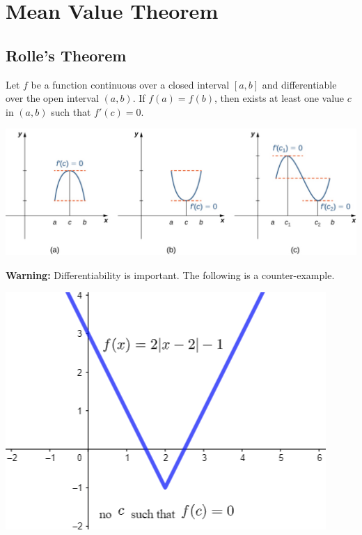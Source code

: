
\hypertarget{mean-value-theorem}{%
\section{Mean Value Theorem}\label{mean-value-theorem}}

\hypertarget{rolles-theorem}{%
\subsection{Rolle's Theorem}\label{rolles-theorem}}

Let \(f\) be a function continuous over a closed interval \([a,b]\) and
differentiable over the open interval \((a,b)\). If \(f(a)=f(b)\), then
exists at least one value \(c\) in \((a,b)\) such that \(f'(c)=0\).

\begin{fullwidth}
  \centering
  \includegraphics[scale=0.3]{img/image-20200323191523596.png}
\end{fullwidth}

\textbf{Warning:} Differentiability is important. The following is a
counter-example.

  \includegraphics[scale=0.4]{img/image-20200323191152101.png}

